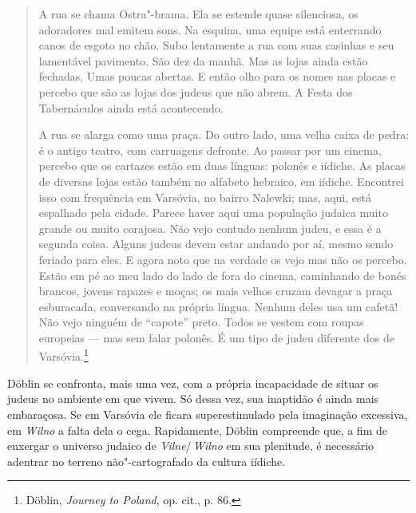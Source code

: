 \begin{quote}
A rua se chama Ostra"-brama. Ela se estende quase silenciosa, os
adoradores mal emitem sons. Na esquina, uma equipe está enterrando canos
de esgoto no chão. Subo lentamente a rua com suas casinhas e seu
lamentável pavimento. São dez da manhã. Mas as lojas ainda estão
fechadas. Umas poucas abertas. E então olho para os nomes nas placas e
percebo que são as lojas dos judeus que não abrem. A Festa dos
Tabernáculos ainda está acontecendo.

A rua se alarga como uma praça. Do outro lado, uma velha caixa de pedra:
é o antigo teatro, com carruagens defronte. Ao passar por um cinema,
percebo que os cartazes estão em duas línguas: polonês e iídiche. As
placas de diversas lojas estão também no alfabeto hebraico, em iídiche.
Encontrei isso com frequência em Varsóvia, no bairro Nalewki; mas, aqui,
está espalhado pela cidade. Parece haver aqui uma população judaica
muito grande ou muito corajosa. Não vejo contudo nenhum judeu, e essa é
a segunda coisa. Alguns judeus devem estar andando por aí, mesmo sendo
feriado para eles. E agora noto que na verdade os vejo mas não os
percebo. Estão em pé ao meu lado do lado de fora do cinema, caminhando
de bonés brancos, jovens rapazes e moças; os mais velhos cruzam devagar
a praça esburacada, conversando na própria língua. Nenhum deles usa um
cafetã! Não vejo ninguém de ``capote'' preto. Todos se vestem com roupas
europeias --- mas sem falar polonês. É um tipo de judeu diferente dos de
Varsóvia.\footnote{Döblin, \textit{Journey to Poland}, op. cit., p. 86.}
\end{quote}

Döblin se confronta, mais uma vez, com a própria incapacidade de situar
os judeus no ambiente em que vivem. Só dessa vez, sua inaptidão é ainda
mais embaraçosa. Se em Varsóvia ele ficara superestimulado pela
imaginação excessiva, em \textit{Wilno} a falta dela o cega. Rapidamente, Döblin
compreende que, a fim de enxergar o universo judaico de \textit{Vilne}/\,\textit{Wilno} em
sua plenitude, é necessário adentrar no terreno não"-cartografado da
cultura iídiche.

\asterisc

